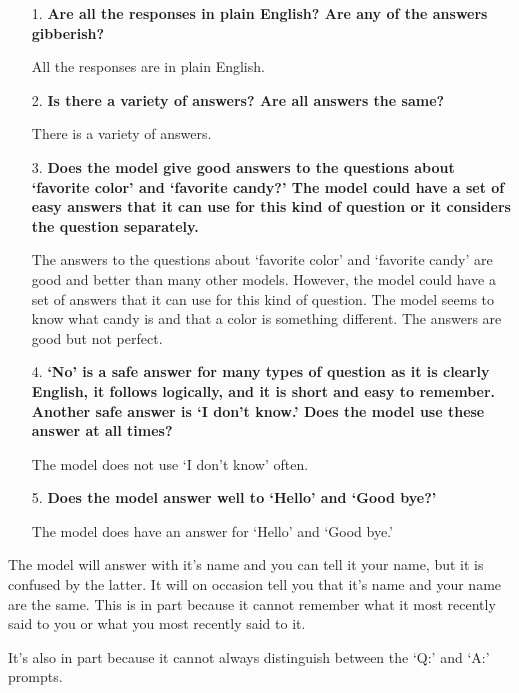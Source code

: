 \begin{itemize}
	\item [1.] \textbf{Are all the responses in plain English? Are any of the answers gibberish?}
	
	\item []All the responses are in plain English. 
	
	\item [2.] \textbf{Is there a  variety of answers? Are all answers the same?}
	
	\item []There is a variety of answers. 
	
	\item [3.] \textbf{Does the model give good answers to the questions about `favorite color' and `favorite candy?' The model could have a set of easy answers that it can use for this kind of question or it considers the question separately. }
	
	\item []The answers to the questions about `favorite color' and `favorite candy' are good and better than many other models. However, the model could have a set of answers that it can use for this kind of question. The model seems to know what candy is and that a color is something different. The answers are good but not perfect.
	
	\item [4.] \textbf{`No' is a safe answer for many types of question as it is clearly English, it follows logically, and it is short and easy to remember. Another safe answer is `I don't know.' Does the model use these answer at all times?}
	
	\item []The model does not use `I don't know' often. 
	
	\item [5.] \textbf{Does the model answer well to `Hello' and `Good bye?'}
	
	\item []The model does have an answer for `Hello' and `Good bye.'
	
\end{itemize}

The model will answer with it's name and you can tell it your name, but it is confused by the latter. It will on occasion tell you that it's name and your name are the same. This is in part because it cannot remember what it most recently said to you or what you most recently said to it. 

It's also in part because it cannot always distinguish between the `Q:' and `A:' prompts.

